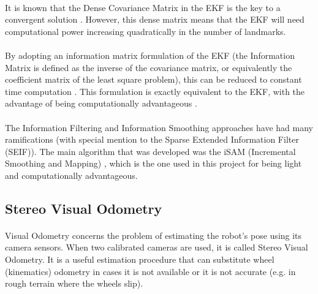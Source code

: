 \documentclass[12pt]{article}
\begin{document}
	\paragraph{}
	It is known that the Dense Covariance Matrix in the EKF is the key to a convergent solution \cite{SLAMPartI}. However, this dense matrix means that the EKF will need computational power increasing quadratically in the number of landmarks.
	
	\paragraph{}
	By adopting an information matrix formulation of the EKF (the Information Matrix is defined as the inverse of the covariance matrix, or equivalently the coefficient matrix of the least square problem), this can be reduced to constant time computation \cite{doi:10.1117/12.381658}. This formulation is exactly equivalent to the EKF, with the advantage of being computationally advantageous \cite{Dellaert-2006-9639}.
	
	\paragraph{}
	The Information Filtering and Information Smoothing approaches have had many ramifications (with special mention to the Sparse Extended Information Filter (SEIF)\cite{doi:10.1117/12.381658}). The main algorithm that was developed was the iSAM (Incremental Smoothing and Mapping) \cite{Kaess08tro}, which is the one used in this project for being light and computationally advantageous.	
	
	\subsection{Stereo Visual Odometry}
	\paragraph{}
	Visual Odometry concerns the problem of estimating the robot's pose using its camera sensors. When two calibrated cameras are used, it is called Stereo Visual Odometry. It is a useful estimation procedure that can substitute wheel (kinematics) odometry in cases it is not available or it is not accurate (e.g. in rough terrain where the wheels slip).
	
\end{document}
